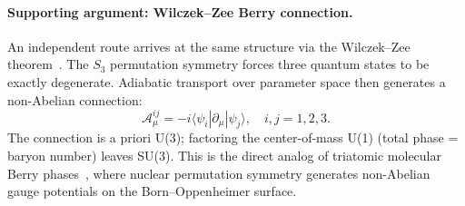 \documentclass[a4paper,12pt]{article}
\begin{document}
\paragraph{Supporting argument: Wilczek--Zee Berry connection.}
An independent route arrives at the same structure via the
Wilczek--Zee theorem~\cite{WZ1984}. The $S_3$ permutation symmetry
forces three quantum states to be exactly degenerate. Adiabatic
transport over parameter space then generates a non-Abelian
connection:
\begin{equation}
 \mathcal{A}_\mu^{ij} = -i\langle \psi_i | \partial_\mu | \psi_j \rangle,
 \quad i,j = 1,2,3.
\end{equation}
The connection is a priori U(3); factoring the center-of-mass U(1)
(total phase = baryon number) leaves SU(3). This is the direct
analog of triatomic molecular Berry phases~\cite{MeadTruhlar1979},
where nuclear permutation symmetry generates non-Abelian gauge
potentials on the Born--Oppenheimer surface.
\end{document}
